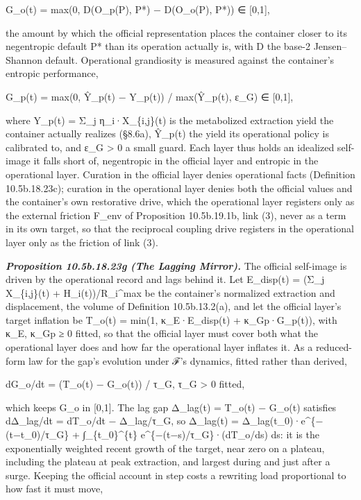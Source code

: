 \documentclass[
]{article}
\begin{document}
G\_o(t) = max(0, D(O\_p(P), P*) − D(O\_o(P), P*)) ∈ {[}0,1{]},

the amount by which the official representation places the container
closer to its negentropic default P* than its operation actually is,
with D the base-2 Jensen--Shannon default. Operational grandiosity is
measured against the container's entropic performance,

G\_p(t) = max(0, Ŷ\_p(t) − Y\_p(t)) / max(Ŷ\_p(t), ε\_G) ∈ {[}0,1{]},

where Y\_p(t) = Σ\_j η\_i·X\_\{i,j\}(t) is the metabolized extraction
yield the container actually realizes (§8.6a), Ŷ\_p(t) the yield its
operational policy is calibrated to, and ε\_G \textgreater{} 0 a small
guard. Each layer thus holds an idealized self-image it falls short of,
negentropic in the official layer and entropic in the operational layer.
Curation in the official layer denies operational facts (Definition
10.5b.18.23c); curation in the operational layer denies both the
official values and the container's own restorative drive, which the
operational layer registers only as the external friction F\_env of
Proposition 10.5b.19.1b, link (3), never as a term in its own target, so
that the reciprocal coupling drive registers in the operational layer
only as the friction of link (3).

\emph{\textbf{Proposition 10.5b.18.23g (The Lagging Mirror).}} The
official self-image is driven by the operational record and lags behind
it. Let E\_disp(t) = (Σ\_j X\_\{i,j\}(t) + H\_i(t))/R\_i\^{}max be the
container's normalized extraction and displacement, the volume of
Definition 10.5b.13.2(a), and let the official layer's target inflation
be T\_o(t) = min(1, κ\_E·E\_disp(t) + κ\_Gp·G\_p(t)), with κ\_E, κ\_Gp ≥
0 fitted, so that the official layer must cover both what the
operational layer does and how far the operational layer inflates it. As
a reduced-form law for the gap's evolution under ℱ's dynamics, fitted
rather than derived,

dG\_o/dt = (T\_o(t) − G\_o(t)) / τ\_G, τ\_G \textgreater{} 0 fitted,

which keeps G\_o in {[}0,1{]}. The lag gap Δ\_lag(t) = T\_o(t) − G\_o(t)
satisfies dΔ\_lag/dt = dT\_o/dt − Δ\_lag/τ\_G, so Δ\_lag(t) =
Δ\_lag(t\_0)·e\^{}\{−(t−t\_0)/τ\_G\} + ∫\_\{t\_0\}\^{}\{t\}
e\^{}\{−(t−s)/τ\_G\}·(dT\_o/ds) ds: it is the exponentially weighted
recent growth of the target, near zero on a plateau, including the
plateau at peak extraction, and largest during and just after a surge.
Keeping the official account in step costs a rewriting load proportional
to how fast it must move,
\end{document}
